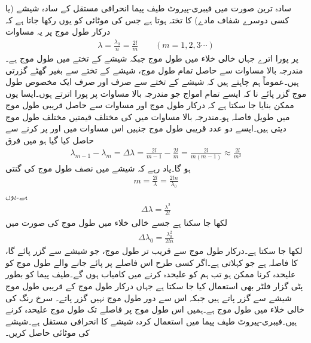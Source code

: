 سادہ ترین صورت میں فیبری-پیروٹ طیف پیما  انحرافی مستقل کے  سادہ شیشے (یا کسی دوسرے شفاف مادے) کا تختہ ہوتا ہے جس کی موٹائی  کو یوں رکھا جاتا ہے کہ درکار طول موج پر یہ مساوات 
\begin{align}\label{مساوات_مستوی_فیبری_پیروٹ_الف}
\lambda=\frac{\lambda_0}{n}=\frac{2l}{m} \quad \quad (m=1,2,3\cdots)
\end{align}
 پر پورا اترے جہاں خالی خلاء میں طول موج  جبکہ شیشے کے تختے میں طول موج  ہے۔مندرجہ بالا مساوات سے حاصل تمام طول موج، شیشے کے تختے سے بغیر گھٹے گزرتی ہیں۔عموماً ہم چاہتے ہیں کہ شیشے کے تختے سے صرف اور صرف ایک مخصوص طول موج گزر پائے نا کہ ایسے تمام امواج جو مندرجہ بالا مساوات پر پورا اترتے ہوں۔ایسا یوں ممکن بنایا جا سکتا ہے کہ درکار طول موج اور مساوات  سے حاصل قریبی طول موج میں طویل فاصلہ ہو۔مندرجہ بالا مساوات میں  کی مختلف قیمتیں مختلف طول موج دیتی ہیں۔ایسے دو عدد قریبی طول موج جنہیں اس مساوات میں   اور  پر کرنے سے حاصل کیا گیا ہو میں فرق 
\begin{align}
\lambda_{m-1}-\lambda_m=\Delta \lambda=\frac{2l}{m-1}-\frac{2l}{m}=\frac{2l}{m(m-1)} \approx \frac{2l}{m^2}
\end{align}
ہو گا۔یاد رہے کہ  شیشے میں نصف طول موج کی گنتی
\begin{align}
m=\frac{2l}{\lambda}=\frac{2ln}{\lambda_0}
\end{align}
ہے۔یوں
\begin{align}
\Delta \lambda=\frac{\lambda^2}{2l}
\end{align}
لکھا جا سکتا ہے جسے خالی خلاء میں طول موج  کی صورت میں
\begin{align}
\Delta \lambda_0=\frac{\lambda_0^2}{2ln}
\end{align}
لکھا جا سکتا ہے۔درکار طول موج  سے قریب تر طول موج، جو شیشے سے گزر پائے گا، کا فاصلہ  ہے جو  کہلاتی ہے۔اگر کسی طرح اس فاصلے پر پائے جانے والے  طول موج کو علیحدہ کرنا ممکن ہو تب ہم  کو علیحدہ کرنے میں کامیاب ہوں گے۔طیف پیما کو بطور پٹی گزار فلٹر بھی استعمال کیا جا سکتا ہے جہاں درکار طول موج کے قریبی طول موج شیشے سے گزر پاتے ہیں جبکہ اس سے دور طول موج نہیں گزر پاتے۔
سرخ رنگ کی خالی خلاء میں طول موج  ہے۔ہمیں اس طول موج پر  فاصلے تک طول موج علیحدہ کرنے ہیں۔فیبری-پیروٹ طیف پیما میں استعمال کردہ شیشے کا انحرافی مستقل  ہے۔شیشے کی موٹائی حاصل کریں۔

